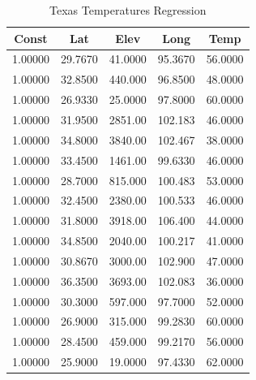 \documentclass{article}
\begin{document}
\begin{table}[h]
\centering
\caption{Texas Temperatures Regression}
\label{tab:Texas-Temps}
\begin{tabular}{|c|c|c|c|c|} \hline 
Const & Lat & Elev & Long & Temp \\ \hline 
1.00000 &	29.7670 &	41.0000 &	95.3670 &	56.0000 \\ \hline 
1.00000 &	32.8500 &	440.000 &	96.8500 &	48.0000 \\ \hline 
1.00000 &	26.9330 &	25.0000 &	97.8000 &	60.0000 \\ \hline 
1.00000 &	31.9500 &	2851.00 &	102.183 &	46.0000 \\ \hline 
1.00000 &	34.8000 &	3840.00 &	102.467 &	38.0000 \\ \hline 
1.00000 &	33.4500 &	1461.00 &	99.6330 &	46.0000 \\ \hline 
1.00000 &	28.7000 &	815.000 &	100.483 &	53.0000 \\ \hline 
1.00000 &	32.4500 &	2380.00 &	100.533 &	46.0000 \\ \hline 
1.00000 &	31.8000 &	3918.00 &	106.400 &	44.0000 \\ \hline 
1.00000 &	34.8500 &	2040.00 &	100.217 &	41.0000 \\ \hline 
1.00000 &	30.8670 &	3000.00 &	102.900 &	47.0000 \\ \hline 
1.00000 &	36.3500 &	3693.00 &	102.083 &	36.0000 \\ \hline 
1.00000 &	30.3000 &	597.000 &	97.7000 &	52.0000 \\ \hline 
1.00000 &	26.9000 &	315.000 &	99.2830 &	60.0000 \\ \hline 
1.00000 &	28.4500 &	459.000 &	99.2170 &	56.0000 \\ \hline 
1.00000 &	25.9000 &	19.0000 &	97.4330 &	62.0000 \\ \hline 
\end{tabular}
\end{table}
\end{document}
